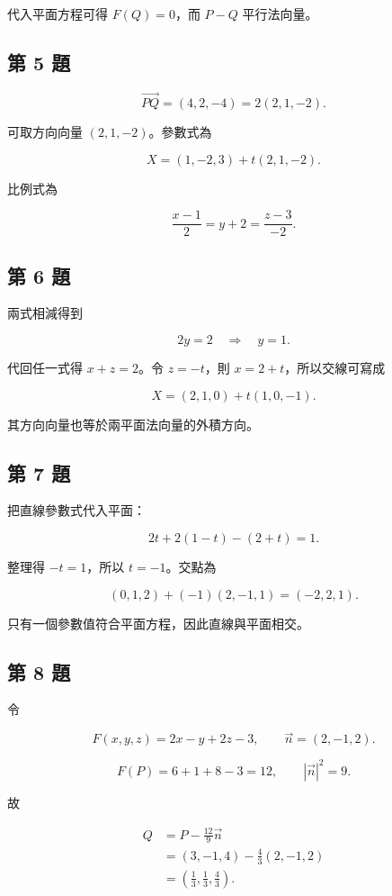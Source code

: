 \documentclass[11pt,a4paper]{article}
\begin{document}
代入平面方程可得 \(F(Q)=0\)，而 \(P-Q\) 平行法向量。

\subsection{第 5 題}\label{ux7b2c-5-ux984c}

\[
\overrightarrow{PQ}=(4,2,-4)=2(2,1,-2).
\]

可取方向向量 \((2,1,-2)\)。參數式為

\[
\boxed{X=(1,-2,3)+t(2,1,-2)}.
\]

比例式為

\[
\boxed{
\frac{x-1}{2}=y+2=\frac{z-3}{-2}
}.
\]

\subsection{第 6 題}\label{ux7b2c-6-ux984c}

兩式相減得到

\[
2y=2\quad\Longrightarrow\quad y=1.
\]

代回任一式得 \(x+z=2\)。令 \(z=-t\)，則 \(x=2+t\)，所以交線可寫成

\[
\boxed{X=(2,1,0)+t(1,0,-1)}.
\]

其方向向量也等於兩平面法向量的外積方向。

\subsection{第 7 題}\label{ux7b2c-7-ux984c}

把直線參數式代入平面：

\[
2t+2(1-t)-(2+t)=1.
\]

整理得 \(-t=1\)，所以 \(t=-1\)。交點為

\[
(0,1,2)+(-1)(2,-1,1)
=\boxed{(-2,2,1)}.
\]

只有一個參數值符合平面方程，因此直線與平面相交。

\subsection{第 8 題}\label{ux7b2c-8-ux984c}

令

\[
F(x,y,z)=2x-y+2z-3,
\qquad \vec n=(2,-1,2).
\]

\[
F(P)=6+1+8-3=12,
\qquad |\vec n|^2=9.
\]

故

\[
\begin{aligned}
Q
&=P-\frac{12}{9}\vec n\\
&=(3,-1,4)-\frac43(2,-1,2)\\
&=\boxed{\left(\frac13,\frac13,\frac43\right)}.
\end{aligned}
\]
\end{document}
